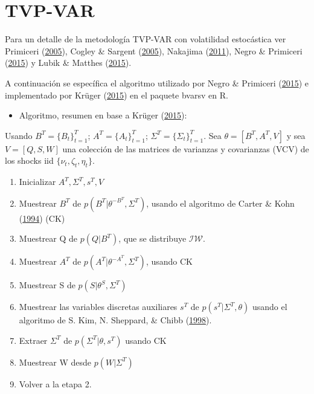 \documentclass[12pt,oneside]{reedthesis}
\providecommand{\tightlist}{%
  \setlength{\itemsep}{0pt}\setlength{\parskip}{0pt}}
\begin{document}
\hypertarget{tvp-var-2}{%
\section{TVP-VAR}\label{tvp-var-2}}

Para un detalle de la metodología TVP-VAR con volatilidad estocástica ver Primiceri (\protect\hyperlink{ref-Primiceri2005}{2005}), Cogley \& Sargent (\protect\hyperlink{ref-Cogley2005}{2005}), Nakajima (\protect\hyperlink{ref-Nakajima2011}{2011}), Negro \& Primiceri (\protect\hyperlink{ref-Primiceri2015}{2015}) y Lubik \& Matthes (\protect\hyperlink{ref-Lubik2016b}{2015}).

A continuación se específica el algoritmo utilizado por Negro \& Primiceri (\protect\hyperlink{ref-Primiceri2015}{2015}) e implementado por Krüger (\protect\hyperlink{ref-Kruger2015}{2015}) en el paquete bvarsv en R.
\begin{itemize}
\tightlist
\item
  Algoritmo, resumen en base a Krüger (\protect\hyperlink{ref-Kruger2015}{2015}):
\end{itemize}
Usando \(B^T= \{B_t\}_{t=1}^T\); \(A^T= \{A_t\}_{t=1}^T\); \(\Sigma^T= \{\Sigma_t\}_{t=1}^T\). Sea \(\theta = [B^T, A^T, V]\) y sea \(V = [Q, S, W]\) una colección de las matrices de varianzas y covarianzas (VCV) de los shocks iid \(\{\nu_t,\zeta_t, \eta_t\}\).
\begin{enumerate}
\def\labelenumi{\arabic{enumi}.}
\tightlist
\item
  Inicializar \(A^T, \Sigma^T, s^T, V\)
\item
  Muestrear \(B^T\) de \(p(B^T|\theta^{-B^T}, \Sigma^T)\), usando el algoritmo de Carter \& Kohn (\protect\hyperlink{ref-KarterKohn1994}{1994}) (CK)
\item
  Muestrear Q de \(p(Q|B^T)\), que se distribuye \(\mathcal{IW}\).
\item
  Muestrear \(A^T\) de \(p(A^T|\theta^{-A^T}, \Sigma^T)\), usando CK
\item
  Muestrear S de \(p(S|\theta^S, \Sigma^T)\)
\item
  Muestrear las variables discretas auxiliares \(s^T\) de \(p(s^T|\Sigma^T, \theta)\) usando el algoritmo de S. Kim, N. Sheppard, \& Chibb (\protect\hyperlink{ref-Kim1998}{1998}).
\item
  Extraer \(\Sigma^T\) de \(p(\Sigma^T|\theta, s^T)\) usando CK
\item
  Muestrear W desde \(p(W|\Sigma^T)\)
\item
  Volver a la etapa 2.
\end{enumerate}
\end{document}
